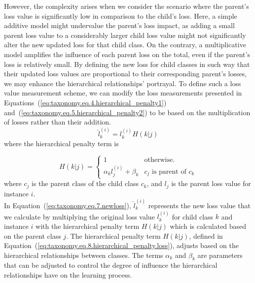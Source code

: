 \documentclass[final,1p,times,authoryear]{elsarticle}
\begin{document}
However, the complexity arises when we consider the scenario where the parent's loss value is significantly low in comparison to the child's loss. Here, a simple additive model might undervalue the parent's loss impact, as adding a small parent loss value to a considerably larger child loss value might not significantly alter the new updated loss for that child class. On the contrary, a multiplicative model amplifies the influence of each parent loss on the total, even if the parent's loss is relatively small. By defining the new loss for child classes in such way that their updated loss values are proportional to their corresponding parent's losses, we may enhance the hierarchical relationships' portrayal. To define such a loss value measurement scheme, we can modify the loss measurements presented in Equations~(\ref{eq:taxonomy.eq.4.hierarchical_penalty1}) and~(\ref{eq:taxonomy.eq.5.hierarchical_penalty2}) to be based on the multiplication of losses rather than their addition.
\begin{equation}
    \label{eq:taxonomy.eq.7.newloss}
    \widehat{l}_k^{(i)} = l_k^{(i)} H( k \vert j)
\end{equation}
where the hierarchical penalty term is

\begin{equation}
    \label{eq:taxonomy.eq.8.hierarchical_penalty.loss}
    H(k \vert j) =
    \left\{ \begin{array}{ll}
    1 & \text{otherwise.}
    \\
    \alpha_k l_j^{(i)} + \beta_k & c_j \text{ is parent of } c_k
    \end{array} \right.
\end{equation}
where $c_j$ is the parent class of the child class $c_k$, and $l_j$ is the parent loss value for instance $i$. \\

In Equation~(\ref{eq:taxonomy.eq.7.newloss}), $\widehat{l}_k^{(i)}$ represents the new loss value that we calculate by multiplying the original loss value $l_k^{(i)}$ for child class $k$ and instance $i$ with the hierarchical penalty term $H(k \vert j)$ which is calculated based on the parent class $j$. The hierarchical penalty term $H(k \vert j)$, defined in Equation~(\ref{eq:taxonomy.eq.8.hierarchical_penalty.loss}), adjusts based on the hierarchical relationships between classes. The terms $\alpha _k$ and $\beta_k$ are parameters that can be adjusted to control the degree of influence the hierarchical relationships have on the learning process.
\end{document}
